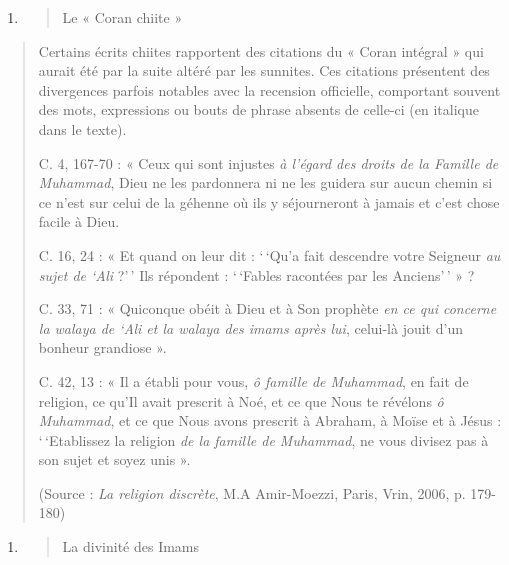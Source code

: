 \begin{enumerate}
\def\labelenumi{\arabic{enumi}.}
\item
  \begin{quote}
  {Le « Coran chiite »}
  \end{quote}
\end{enumerate}

\begin{quote}
Certains écrits chiites rapportent des citations du « Coran intégral »
qui aurait été par la suite altéré par les sunnites. Ces citations
présentent des divergences parfois notables avec la recension
officielle, comportant souvent des mots, expressions ou bouts de phrase
absents de celle-ci (en italique dans le texte).

C. 4, 167-70 : « Ceux qui sont injustes \emph{à l'égard des droits de la
Famille de Muhammad}, Dieu ne les pardonnera ni ne les guidera sur aucun
chemin si ce n'est sur celui de la géhenne où ils y séjourneront à
jamais et c'est chose facile à Dieu.

C. 16, 24 : « Et quand on leur dit : `\,`Qu'a fait descendre votre
Seigneur \emph{au sujet de `Ali} ?'\,' Ils répondent : `\,`Fables
racontées par les Anciens'\,' » ?

C. 33, 71 : « Quiconque obéit à Dieu et à Son prophète \emph{en ce qui
concerne la walaya de `Ali et la walaya des imams après lui}, celui-là
jouit d'un bonheur grandiose ».

C. 42, 13 : « Il a établi pour vous, \emph{ô famille de Muhammad}, en
fait de religion, ce qu'Il avait prescrit à Noé, et ce que Nous te
révélons \emph{ô Muhammad}, et ce que Nous avons prescrit à Abraham, à
Moïse et à Jésus : `\,`Etablissez la religion \emph{de la famille de
Muhammad}, ne vous divisez pas à son sujet et soyez unis ».

(Source : \emph{La religion discrète}, M.A Amir-Moezzi, Paris, Vrin,
2006, p. 179-180)
\end{quote}

\begin{enumerate}
\def\labelenumi{\arabic{enumi}.}
\setcounter{enumi}{1}
\item
  \begin{quote}
  {La divinité des Imams}
  \end{quote}
\end{enumerate}

